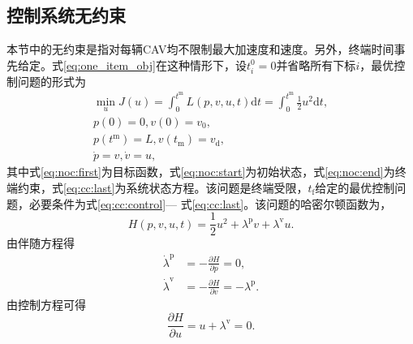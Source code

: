 \subsection{控制系统无约束}
\label{ssec:noc}
本节中的无约束是指对每辆CAV均不限制最大加速度和速度。另外，终端时间事先给定。式\eqref{eq:one_item_obj}在这种情形下，设$t_i^{0}=0$并省略所有下标$i$，最优控制问题的形式为
\begin{gather}
\min_{u} J(u)=\int_{0}^{t^\mathrm{m}}L(p,v,u,t)\mathrm{d}t=\int_{0}^{t^\mathrm{m}}\frac12 u^2\mathrm{d}t,\label{eq:noc:first}\\
p(0)=0, v(0)=v_0,\label{eq:noc:start}\\
p(t^\mathrm{m})=L, v(t_\mathrm{m})=v_\mathrm{d},\label{eq:noc:end}\\
\dot{p}=v, \dot{v}=u, \label{eq:noc:last}
\end{gather}
其中式\eqref{eq:noc:first}为目标函数，式\eqref{eq:noc:start}为初始状态，式\eqref{eq:noc:end}为终端约束，式\eqref{eq:cc:last}为系统状态方程。该问题是终端受限，$t_\mathrm{f}$给定的最优控制问题，必要条件为式\eqref{eq:cc:control}--- 式\eqref{eq:cc:last}。该问题的哈密尔顿函数为，
\begin{equation}
H(p,v,u,t)=\frac12 u^2+\lambda^\mathrm{p}v + \lambda^\mathrm{v}u.
\end{equation}
由伴随方程得
\begin{align}
\dot{\lambda}^\mathrm{p}&=-\frac{\partial H}{\partial p}=0, \label{eq:dlp}\\
\dot{\lambda}^\mathrm{v}&=-\frac{\partial H}{\partial v}=-\lambda^\mathrm{p}. \label{eq:dlv}
\end{align}
由控制方程可得
\begin{equation}
\frac{\partial H}{\partial u}=u+\lambda^\mathrm{v}=0.
\label{eq:uwrtlv}
\end{equation}

